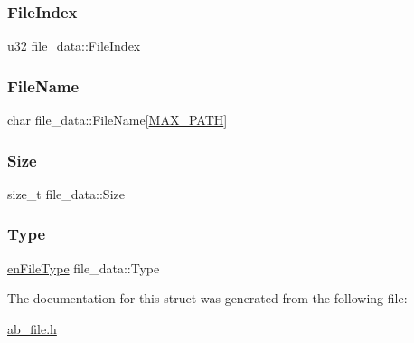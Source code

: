 \subsubsection{\texorpdfstring{File\+Index}{FileIndex}}
{\footnotesize\ttfamily \hyperlink{ab__common_8h_afaa62991928fb9fb18ff0db62a040aba}{u32} file\+\_\+data\+::\+File\+Index}

\mbox{\label{structfile__data_a3a1dc6a36635557387bc2f0c2e99b2b2}} 
\subsubsection{\texorpdfstring{File\+Name}{FileName}}
{\footnotesize\ttfamily char file\+\_\+data\+::\+File\+Name\mbox{[}\hyperlink{ab__file_8h_ab99ded389af74001a6298fc9e44e74e5}{M\+A\+X\+\_\+\+P\+A\+TH}\mbox{]}}

\mbox{\label{structfile__data_a72812241b55929a508538f596b52b7d7}} 
\subsubsection{\texorpdfstring{Size}{Size}}
{\footnotesize\ttfamily size\+\_\+t file\+\_\+data\+::\+Size}

\mbox{\label{structfile__data_a08ce87775b0af51c6462c969706cf58e}} 
\subsubsection{\texorpdfstring{Type}{Type}}
{\footnotesize\ttfamily \hyperlink{ab__file_8h_a1b665fc63cb310d53283fbcd1b19746e}{en\+File\+Type} file\+\_\+data\+::\+Type}



The documentation for this struct was generated from the following file\+:\begin{DoxyCompactItemize}
\item 
\hyperlink{ab__file_8h}{ab\+\_\+file.\+h}\end{DoxyCompactItemize}
